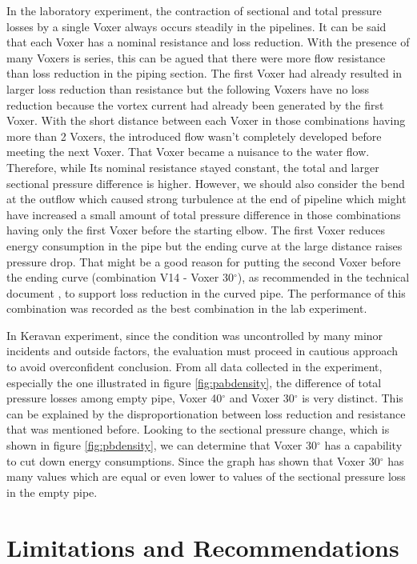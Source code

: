 In the laboratory experiment, the contraction of sectional and total pressure losses by a single Voxer always occurs steadily in the pipelines. It can be said that each Voxer has a nominal resistance and loss reduction. With the presence of many Voxers is series, this can be agued that there were more flow resistance than loss reduction in the piping section. The first Voxer had already resulted in larger loss reduction than resistance but the following Voxers have no loss reduction because the vortex current had already been generated by the first Voxer. With the short distance between each Voxer in those combinations having more than 2 Voxers, the introduced flow wasn't completely developed before meeting the next Voxer. That Voxer became a nuisance to the water flow. Therefore, while Its nominal resistance stayed constant, the total and larger sectional pressure difference is higher. 
However, we should also consider the bend at the outflow which caused strong turbulence at the end of pipeline which might have increased a small amount of total pressure difference in those combinations having only the first Voxer before the starting elbow. The first Voxer reduces energy consumption in the pipe but the ending curve at the large distance raises pressure drop. That might be a good reason for putting the second Voxer before the ending curve (combination V14 - Voxer 30$^{\circ}$), as recommended in the technical document \cite{voxer:article}, to support loss reduction in the curved pipe. The performance of this combination was recorded as the best combination in the lab experiment. 

In Keravan experiment, since the condition was uncontrolled by many minor incidents and outside factors, the evaluation must proceed in cautious approach to avoid overconfident conclusion. From all data collected in the experiment, especially the one illustrated in figure \ref{fig:pabdensity}, the difference of total pressure losses among empty pipe, Voxer 40$^{\circ}$ and Voxer 30$^{\circ}$ is very distinct. This can be explained by the disproportionation between loss reduction and resistance that was mentioned before. Looking to the sectional pressure change, which is shown in figure \ref{fig:pbdensity}, we can determine that Voxer 30$^{\circ}$ has a capability to cut down energy consumptions. Since the graph has shown that Voxer 30$^{\circ}$ has many values which are equal or even lower to values of the sectional pressure loss in the empty pipe. 

\section{Limitations and Recommendations}

